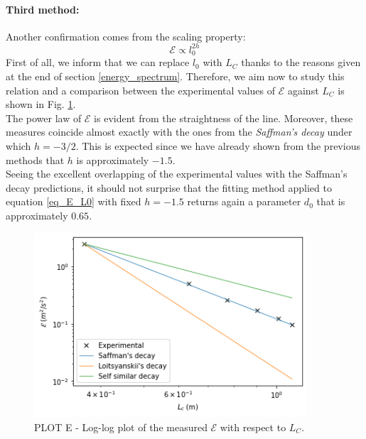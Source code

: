 \documentclass[11pt,titlepage]{article}
\begin{document}
\paragraph{Third method:}
Another confirmation comes from the scaling property:
\begin{equation}\label{eq_E_L0}
	\mathcal{E} \propto l_0^{2h}
\end{equation}
First of all, we inform that we can replace $l_0$ with $L_C$ thanks to the reasons given at the end of section \ref{energy_spectrum}. Therefore, we aim now to study this relation and a comparison between the experimental values of $\mathcal{E}$ against $L_C$ is shown in Fig. \ref{fig7}. \\
The power law of $\mathcal{E}$ is evident from the straightness of the line. Moreover, these measures coincide almost exactly with the ones from the \emph{Saffman's decay} under which $h=-3/2$. This is expected since we have already shown from the previous methods that $h$ is approximately $-1.5$. \\
Seeing the excellent overlapping of the experimental values with the Saffman's decay predictions, it should not surprise that the fitting method applied  to equation \ref{eq_E_L0} with fixed $h=-1.5$ returns again a parameter $d_0$ that is approximately $0.65$. 

\newpage
	\begin{center} 
	\begin{figure} [h!]
		\centering
		\includegraphics[width = 4in]{./figures/ex1_5_3.png}
		\caption{PLOT E - Log-log plot of the measured $\mathcal{E}$ with respect to $L_C$.}
		\label{fig7}
	\end{figure}
\end{center}
\end{document}
